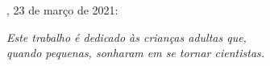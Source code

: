 \documentclass[
	10pt,				%
	oneside,			%
	a4paper,			%
	chapter=TITLE,		%
	english,			%
	brazil				%
	]{abntex2}
\begin{document}

%
% 
%
\begin{folhadeaprovacao}

  \begin{center}
    {\ABNTEXchapterfont\large\MakeUppercase{\imprimirautor}}

    \vspace*{\fill}\vspace*{\fill}
    \begin{center}
      \ABNTEXchapterfont\bfseries\Large\MakeUppercase{\imprimirtitulo}
    \end{center}
    \vspace*{\fill}
    
    \imprimirtextoaprovacao
     
    \vspace*{1cm}
    
	\imprimirlocal, 23 de março de 2021:

    \vspace*{\fill}

   \end{center}
        


      
    \vspace*{1cm}  
  
\end{folhadeaprovacao}

\begin{dedicatoria}
   \vspace*{\fill}
   \begin{flushright}
   \noindent
   \textit{ Este trabalho é dedicado às crianças adultas que,\\
   quando pequenas, sonharam em se tornar cientistas.}\vspace*{2cm}
   \end{flushright}
\end{dedicatoria}
\end{document}
